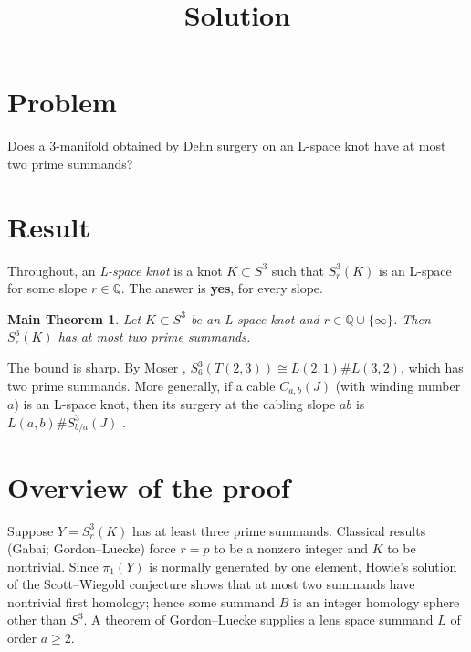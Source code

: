 \documentclass[11pt]{article}
\title{Solution}
\author{}
\date{}
\newtheorem*{maintheorem}{Main Theorem}
\theoremstyle{definition}
\newcommand{\Q}{\mathbb{Q}}
\begin{document}
\maketitle

\section*{Problem}

Does a $3$-manifold obtained by Dehn surgery on an L-space knot have at most two prime summands?

\section*{Result}

Throughout, an \emph{L-space knot} is a knot $K\subset S^3$ such that $S^3_r(K)$ is an L-space for some slope $r\in\Q$. The answer is \textbf{yes}, for every slope.

\begin{maintheorem}
Let $K\subset S^3$ be an L-space knot and $r\in\Q\cup\{\infty\}$. Then $S^3_r(K)$ has at most two prime summands.
\end{maintheorem}

The bound is sharp. By Moser \cite{Moser}, $S^3_6(T(2,3))\cong L(2,1)\# L(3,2)$, which has two prime summands. More generally, if a cable $C_{a,b}(J)$ (with winding number $a$) is an L-space knot, then its surgery at the cabling slope $ab$ is $L(a,b)\# S^3_{b/a}(J)$ \cite{Gordon83}.

\section*{Overview of the proof}

Suppose $Y=S^3_r(K)$ has at least three prime summands. Classical results (Gabai; Gordon--Luecke) force $r=p$ to be a nonzero integer and $K$ to be nontrivial. Since $\pi_1(Y)$ is normally generated by one element, Howie's solution of the Scott--Wiegold conjecture shows that at most two summands have nontrivial first homology; hence some summand $B$ is an integer homology sphere other than $S^3$. A theorem of Gordon--Luecke supplies a lens space summand $L$ of order $a\ge 2$.
\end{document}
